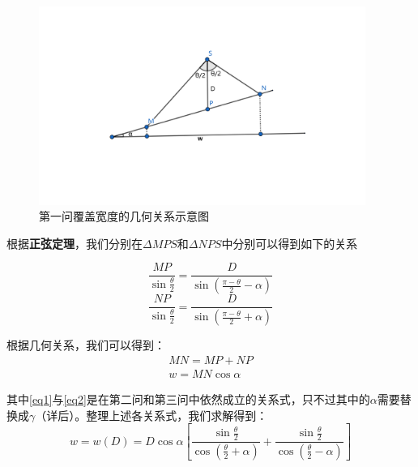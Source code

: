 \documentclass{article}
\begin{document}
	\begin{figure}[H]
		\centering  %
		\includegraphics[width=0.95\textwidth]{问题一//问题一几何关系示意图}
		\caption{第一问覆盖宽度的几何关系示意图}
		\label{pro1Geo}
	\end{figure}
	\par 根据\textbf{正弦定理}，我们分别在$\Delta MPS$和$\Delta NPS$中分别可以得到如下的关系
	
	\[
		\frac{MP}{\sin\frac{\theta}{2}} = \frac{D}{\sin(\frac{\pi-\theta}{2}-\alpha)}    
	\]
	\[
	\frac{NP}{\sin\frac{\theta}{2}} = \frac{D}{\sin(\frac{\pi-\theta}{2}+\alpha)}   \]
	
%		
%	

	\par 根据几何关系，我们可以得到：
	\begin{align}
		MN = MP + NP \label{eq1}  \\
		w = MN\cos\alpha  \label{eq2} 
	\end{align}
	
	\par 其中\eqref{eq1}与\eqref{eq2}是在第二问和第三问中依然成立的关系式，只不过其中的$\alpha$需要替换成$\gamma$（详后）。整理上述各关系式，我们求解得到：
	\begin{equation}
		w = w(D) = D\cos\alpha\left[\frac{\sin\frac{\theta}{2}}{\cos(\frac{\theta}{2}+\alpha)}  +  \frac{\sin\frac{\theta}{2}}{\cos(\frac{\theta}{2}-\alpha)}\right] \label{eq3}
	\end{equation}
\end{document}
